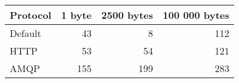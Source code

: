 \begin{tabular}{lrrr}
\hline
 Protocol   &   1 byte &   2500 bytes &   100 000 bytes \\
\hline
 Default    &       43 &            8 &             112 \\
 HTTP       &       53 &           54 &             121 \\
 AMQP       &      155 &          199 &             283 \\
\hline
\end{tabular}